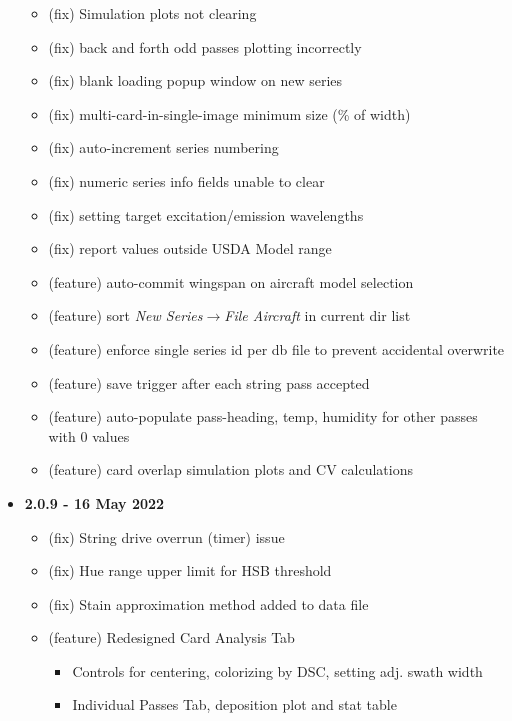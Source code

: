 \documentclass[10pt,letterpaper,titlepage]{article}
\begin{document}
\begin{itemize}
        \begin{itemize}
            \item (fix) Simulation plots not clearing
            \item (fix) back and forth odd passes plotting incorrectly
            \item (fix) blank loading popup window on new series
            \item (fix) multi-card-in-single-image minimum size (\% of width)
            \item (fix) auto-increment series numbering
            \item (fix) numeric series info fields unable to clear
            \item (fix) setting target excitation/emission wavelengths
            \item (fix) report values outside USDA Model range
            \item (feature) auto-commit wingspan on aircraft model selection
            \item (feature) sort \textit{New Series$\rightarrow$File Aircraft} in current dir list
            \item (feature) enforce single series id per db file to prevent accidental overwrite
            \item (feature) save trigger after each string pass accepted
            \item (feature) auto-populate pass-heading, temp, humidity for other passes with 0 values
            \item (feature) card overlap simulation plots and CV calculations
        \end{itemize}
        \item \textbf{2.0.9 - 16 May 2022}
        \begin{itemize}
            \item (fix) String drive overrun (timer) issue
            \item (fix) Hue range upper limit for HSB threshold
            \item (fix) Stain approximation method added to data file
            \item (feature) Redesigned Card Analysis Tab
            \begin{itemize}
                \item Controls for centering, colorizing by DSC, setting adj. swath width
                \item Individual Passes Tab, deposition plot and stat table

\end{itemize}
\end{itemize}
\end{itemize}
\end{document}
